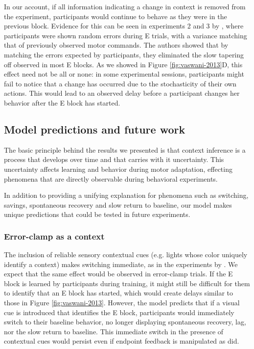 \documentclass[a4paper,doc,floatsintext,natbib]{apa6}
\def \fref #1{Figure \ref{#1}}     %
\begin{document}
In our account, if all information indicating a change in context is removed from the experiment, participants would continue to behave as they were in the previous block. Evidence for this can be seen in experiments 2 and 3 by \cite{Vaswani_Decay_2013}, where participants were shown random errors during E trials, with a variance matching that of previously observed motor commands. The authors showed that by matching the errors expected by participants, they eliminated the slow tapering off observed in most E blocks. As we showed in \fref{fig:vaswani-2013}D, this effect need not be all or none: in some experimental sessions, participants might fail to notice that a change has occurred due to the stochasticity of their own actions. This would lead to an observed delay before a participant changes her behavior after the E block has started.


\subsection{Model predictions and future work}
The basic principle behind the results we presented is that context inference is a process that develops over time and that carries with it uncertainty. This uncertainty affects learning and behavior during motor adaptation, effecting phenomena that are directly observable during behavioral experiments.

In addition to providing a unifying explanation for phenomena such as switching, savings, spontaneous recovery and slow return to baseline, our model makes unique predictions that could be tested in future experiments.

\subsubsection{Error-clamp as a context}
The inclusion of reliable sensory contextual cues (e.g. lights whose color uniquely identify a context) makes switching immediate, as in the experiments by \cite{Kim_Neural_2015}. We expect that the same effect would be observed in error-clamp trials. If the E block is learned by participants during training, it might still be difficult for them to identify that an E block has started, which would create delays similar to those in \fref{fig:vaswani-2013}. However, the model predicts that if a visual cue is introduced that identifies the E block, participants would immediately switch to their baseline behavior, no longer displaying spontaneous recovery, lag, nor the slow return to baseline. This immediate switch in the presence of contextual cues would persist even if endpoint feedback is manipulated as \cite{Vaswani_Decay_2013} did.
\end{document}
